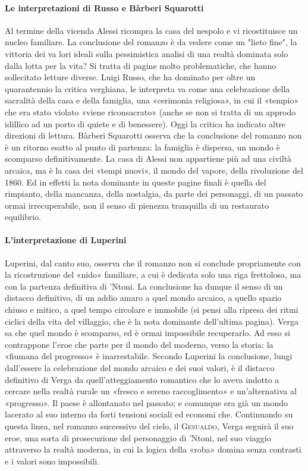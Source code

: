 \documentclass{book}
\newcounter{mar}
\begin{document}
\paragraph{Le interpretazioni di Russo e Bàrberi Squarotti} Al termine della vicenda Alessi ricompra la casa del nespolo e vi ricostituisce un nucleo familiare. La conclusione del romanzo è da vedere come un "lieto fine", la vittoria dei va lori ideali sulla pessimistica analisi di una realtà dominata solo dalla lotta per la vita? Si tratta di pagine molto problematiche, che hanno sollecitato letture diverse. Luigi Russo, che ha dominato per oltre un quarantennio la critica verghiana, le interpreta va come una celebrazione della sacralità della casa e della famiglia, una «cerimonia religiosa», in cui il «tempio» che era stato violato «viene riconsacrato» (anche se non si tratta di un approdo idillico ad un porto di quiete e di benessere). Oggi la critica ha indicato altre direzioni di lettura. Bàrberi Squarotti osserva che la conclusione del romanzo non è un ritorno esatto al punto di partenza: la famiglia è dispersa, un mondo è scomparso definitivamente. La casa di Alessi non appartiene più ad una civiltà arcaica, ma è la casa dei «tempi nuovi», il mondo del vapore, della rivoluzione del 1860. Ed in effetti la nota dominante in queste pagine finali è quella del rimpianto, della mancanza, della nostalgia, da parte dei personaggi, di un passato ormai irrecuperabile, non il senso di pienezza tranquilla di un restaurato equilibrio.

\paragraph{L'interpretazione di Luperini} Luperini, dal canto suo, osserva che il romanzo non si conclude propriamente con la ricostruzione del «nido» familiare, a cui è dedicata solo una riga frettolosa, ma con la partenza definitiva di 'Ntoni. La conclusione ha dunque il senso di un distacco definitivo, di un addio amaro a quel mondo arcaico, a quello spazio chiuso e mitico, a quel tempo circolare e immobile (si pensi alla ripresa dei ritmi ciclici della vita del villaggio, che è la nota dominante dell'ultima pagina). Verga sa che quel mondo è scomparso, ed è ormai impossibile recuperarlo. Ad esso si contrappone l'eroe che parte per il mondo del moderno, verso la storia: la «fiumana del progresso» è inarrestabile. Secondo Luperini la conclusione, lungi dall'essere la celebrazione del mondo arcaico e dei suoi valori, è il distacco definitivo di Verga da quell'atteggiamento romantico che lo aveva indotto a cercare nella realtà rurale un «fresco e sereno raccoglimento» e un'alternativa al «progresso». Il paese è allontanato nel passato; e comunque era già un mondo lacerato al suo interno da forti tensioni sociali ed economi che. Continuando su questa linea, nel romanzo successivo del cielo, il \textsc{Gesualdo}, Verga seguirà il suo eroe, una sorta di prosecuzione del personaggio di 'Ntoni, nel suo viaggio attraverso la realtà moderna, in cui la logica della «roba» domina senza contrasti e i valori sono impossibili.
\end{document}
